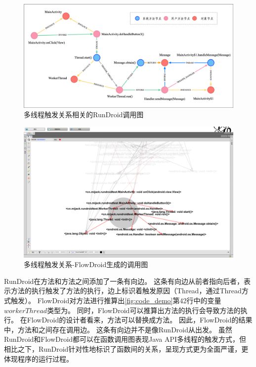 \begin{figure}[ht]
	\centering
	\includegraphics[width=\textwidth]{./Figures/android-handler-rundroid.png}
	\caption{多线程触发关系相关的RunDroid调用图}
	\label{fig:rundroid-result-handler}
\end{figure}



\begin{figure}[ht]
	\centering
	\includegraphics[width=\textwidth]{./Figures/FlowDroid-handler.png}
	\caption{多线程触发关系-FlowDroid生成的调用图}
	\label{fig:flowdroid-result-handler}
\end{figure}





RunDroid在方法和方法之间添加了一条有向边。
这条有向边从前者指向后者，表示方法的执行触发了方法的执行，边上标识着触发原因（Thread，通过Thread方式触发）。
FlowDroid对方法进行推算出\autoref{fig:code_demo}第42行中的变量$workerThread$类型为。
同时，FlowDroid可以推算出方法的执行会导致方法的执行。
在FlowDroid的设计者看来，方法可以替换成方法。
因此，FlowDroid的结果中，方法和之间存在调用边。
这条有向边并不是像RunDroid从出发。
虽然RunDroid和FlowDroid都可以在函数调用图表现Java API多线程的触发方式，但相比之下，RunDroid针对性地标识了函数间的关系，呈现方式更为全面严谨，更体现程序的运行过程。



